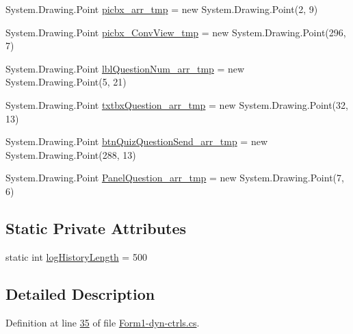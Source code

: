 \begin{DoxyCompactItemize}
\item 
\-System.\-Drawing.\-Point \hyperlink{class_sr_p___classroom_inq_1_1frm_classrrom_inq_a019be294be5d02bea4369298d2a135db}{picbx\-\_\-arr\-\_\-tmp} = new \-System.\-Drawing.\-Point(2, 9)
\item 
\-System.\-Drawing.\-Point \hyperlink{class_sr_p___classroom_inq_1_1frm_classrrom_inq_ae49fd425a3c4f52d94af6c20b67f6126}{picbx\-\_\-\-Conv\-View\-\_\-tmp} = new \-System.\-Drawing.\-Point(296, 7)
\item 
\-System.\-Drawing.\-Point \hyperlink{class_sr_p___classroom_inq_1_1frm_classrrom_inq_a9af0d3cc5171be1c8b01ea1e208d61ee}{lbl\-Question\-Num\-\_\-arr\-\_\-tmp} = new \-System.\-Drawing.\-Point(5, 21)
\item 
\-System.\-Drawing.\-Point \hyperlink{class_sr_p___classroom_inq_1_1frm_classrrom_inq_a09f25b6934ed463e8b781498b5511796}{txtbx\-Question\-\_\-arr\-\_\-tmp} = new \-System.\-Drawing.\-Point(32, 13)
\item 
\-System.\-Drawing.\-Point \hyperlink{class_sr_p___classroom_inq_1_1frm_classrrom_inq_a8dcbe5ae5d44d445994571c17345e756}{btn\-Quiz\-Question\-Send\-\_\-arr\-\_\-tmp} = new \-System.\-Drawing.\-Point(288, 13)
\item 
\-System.\-Drawing.\-Point \hyperlink{class_sr_p___classroom_inq_1_1frm_classrrom_inq_a3e546b9b0c603a788d0316efe572c960}{\-Panel\-Question\-\_\-arr\-\_\-tmp} = new \-System.\-Drawing.\-Point(7, 6)
\end{DoxyCompactItemize}
\subsection*{\-Static \-Private \-Attributes}
\begin{DoxyCompactItemize}
\item 
static int \hyperlink{class_sr_p___classroom_inq_1_1frm_classrrom_inq_a0b55eb955abb243808249457ac92ca93}{log\-History\-Length} = 500
\end{DoxyCompactItemize}


\subsection{\-Detailed \-Description}


\-Definition at line \hyperlink{_form1-dyn-ctrls_8cs_source_l00035}{35} of file \hyperlink{_form1-dyn-ctrls_8cs_source}{\-Form1-\/dyn-\/ctrls.\-cs}.



